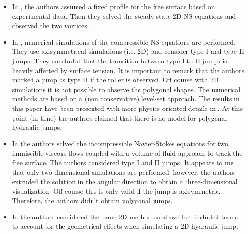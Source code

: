 \documentclass[english,11pt]{article}
\let\cite=\citet
\numberwithin{remark}{subsection}
\begin{document}
\begin{itemize}
\item In \cite{bohr1996hydraulic}, the authors assumed a fixed profile for the free surface based on experimental data.
  Then they solved the steady state 2D-NS equations and observed the two vortices.

\item In \cite{yokoi2002mechanism}, numerical simulations of the compressible NS equations are performed.
  They use axisymmetrical simulations (i.e. 2D) and consider type I and type II jumps.
  They concluded that the transition between type I to II jumps is heavily affected by surface tension.
  It is important to remark that the authors marked a jump as type II if the roller is observed.
  Off course with 2D simulations it is not possible to observe the polygonal shapes. 
  The numerical methods are based on a (non conservative) level-set approach.
  The results in this paper have been presented with more physics oriented details in
  \cite{yokoi2000relationships,yokoi1999numerical}.
  At this point (in time) the authors claimed that there is no model for polygonal hydraulic jumps.

\item In \cite{passandideh2011numerical} the authors solved the incompressible Navier-Stokes equations for two immiscible
  viscous flows coupled with a volume-of-fluid approach to track the free surface.
  The authors considered type I and II jumps.
  It appears to me that only two-dimensional simulations are performed; however, the authors extruded
  the solution in the angular direction to obtain a three-dimensional visualization. Off course this is
  only valid if the jump is axisymmetric. Therefore, the authors didn't obtain polygonal jumps.

\item In \cite{teymourtash2010experimental} the authors considered the same 2D method as above but
  included terms to account for the geometrical effects when simulating a 2D hydraulic jump. 
\end{itemize}
\end{document}
